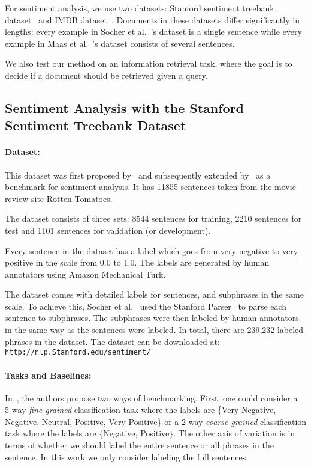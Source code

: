 \documentclass{article}
\begin{document}
For sentiment analysis, we use two datasets: Stanford sentiment
treebank dataset~\cite{socher13} and IMDB
dataset~\cite{maas11}. Documents in these datasets differ
significantly in lengths: every example in Socher et
al.~\cite{socher13}'s dataset is a single sentence while every example
in Maas et al.~\cite{maas11}'s dataset consists of several sentences.

We also test our method on an information retrieval task, where the
goal is to decide if a document should be retrieved given a query.

\subsection{Sentiment Analysis with the Stanford Sentiment Treebank Dataset}
\paragraph{Dataset:}
This dataset was first proposed by~\cite{Pang+Lee:05a} and
subsequently extended by~\cite{socher13} as a benchmark for sentiment
analysis. It has 11855 sentences taken from the movie review site
Rotten Tomatoes. 




The dataset consists of three sets: 8544 sentences for training, 2210
sentences for test and 1101 sentences for validation (or development).

Every sentence in the dataset has a label which goes from very
negative to very positive in the scale from 0.0 to 1.0. The labels are
generated by human annotators using Amazon Mechanical Turk.

The dataset comes with detailed labels for sentences, and subphrases
in the same scale. To achieve this, Socher et al.~\cite{socher13} used
the Stanford Parser~\cite{klein03} to parse each sentence to
subphrases. The subphrases were then labeled by human annotators in
the same way as the sentences were labeled. In total, there are
239,232 labeled phrases in the dataset. The dataset can be downloaded
at: {\tt http://nlp.Stanford.edu/sentiment/}

\paragraph{Tasks and Baselines:}
In~\cite{socher13}, the authors propose two ways of
benchmarking. First, one could consider a 5-way \emph{fine-grained}
classification task where the labels are \{Very Negative, Negative,
Neutral, Positive, Very Positive\} or a 2-way \emph{coarse-grained}
classification task where the labels are \{Negative,
Positive\}. The other axis of variation is in terms of whether we
should label the entire sentence or all phrases in the sentence.
In this work we only consider labeling the full sentences.
\end{document}
